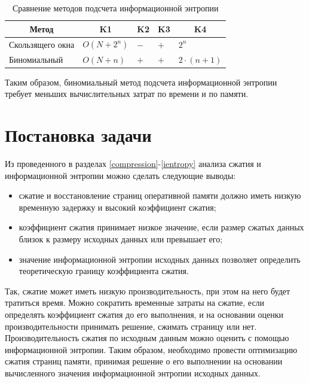 \begin{table}[h]
    \caption{Сравнение методов подсчета информационной энтропии}
    \begin{center}
        \begin{tabular}{|l|l|l|l|l|}
        		\hline
            \multicolumn{1}{|c}{\textbf{Метод}} & 
            \multicolumn{1}{|c|}{\textbf{K1}} &
            \multicolumn{1}{c|}{\textbf{K2}} &
            \multicolumn{1}{c|}{\textbf{K3}} & 
            \multicolumn{1}{c|}{\textbf{K4}} \\ \hline
            Скользящего окна &  $O(N + 2^n)$ & $-$ & $+$ & $2^n$ \\ \hline
            Биномиальный &  $O(N + n)$ & $+$ & $+$ & $2 \cdot (n + 1)$ \\ \hline
        \end{tabular}
    \end{center}
    \label{tab:comparison}
\end{table}

Таким образом, биномиальный метод подсчета информационной энтропии требует меньших вычислительных затрат по времени и по памяти.

\section{Постановка задачи}

Из проведенного в разделах \ref{compression}-\ref{ientropy} анализа сжатия и информационной энтропии можно сделать следующие выводы:

\begin{itemize}
	\item сжатие и восстановление страниц оперативной памяти должно иметь низкую временную задержку и высокий коэффициент сжатия;
    \item коэффициент сжатия принимает низкое значение, если размер сжатых данных близок к размеру исходных данных или превышает его;
	\item значение информационной энтропии исходных данных позволяет определить теоретическую границу коэффициента сжатия.
\end{itemize}

Так, сжатие может иметь низкую производительность, при этом на него будет тратиться время. Можно сократить временные затраты на сжатие, если определять коэффициент сжатия до его выполнения, и на основании оценки производительности принимать решение, сжимать страницу или нет. Производительность сжатия по исходным данным можно оценить с помощью информационной энтропии. Таким образом, необходимо провести оптимизацию сжатия страниц памяти, принимая решение о его выполнении на основании вычисленного значения информационной энтропии исходных данных.

